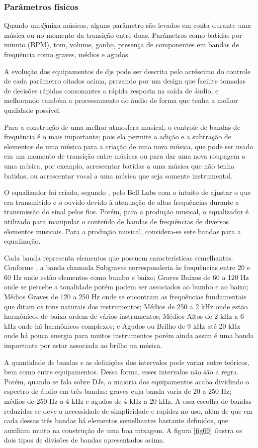 \subsubsection{Parâmetros físicos}
Quando um\textit{dj}mixa músicas, alguns parâmetro são levados em conta durante uma música ou no momento da transição entre duas. Parâmetros como batidas por minuto (BPM), tom, volume, ganho, presença de componentes em bandas de frequência como graves, médios e agudos.
\par
A evolução dos equipamentos de djs pode ser descrita pelo acréscimo do controle de cada parâmetro citados acima, prezando por um design que facilite tomadas de decisões rápidas consonantes a rápida resposta na saída de áudio, e melhorando também o processamento do áudio de forma que tenha a melhor qualidade possível.
\par
Para a construção de uma melhor atmosfera musical, o controle de bandas de frequência é o mais importante; pois ela permite a adição e a subtração de elementos de uma música para a criação de uma nova música, que pode ser usado em um momento de transição entre músicas ou para dar uma nova roupagem a uma música, por exemplo, acrescentar batidas a uma música que não tenha batidas, ou acrescentar vocal a uma música que seja somente instrumental.
\par
O equalizador foi criado, segundo \cite{mixing}, pelo Bell Labs com o intuito de ajustar o que era transmitido e o ouvido devido à atenuação de altas frequências durante a transmissão do sinal pelos fios. Porém, para a produção musical, o equalizador é utilizado para manipular o conteúdo de bandas de frequências de diversos elementos musicais. 
Para a produção musical, considera-se sete bandas para a equalização.
\par 
Cada banda representa elementos que possuem características semelhantes. Conforme \cite{mixing}, a banda chamada Subgraves corresponderia às frequências entre 20 e 60 Hz onde estão elementos como bumbo e baixo; Graves Baixos de 60 a 120 Hz onde se percebe a tonalidade porém podem ser associados ao bumbo e ao baixo; Médios Graves de 120 a 250 Hz onde se encontram as frequências fundamentais que ditam os tons naturais dos instrumentos; Médios de 250 a 2 kHz onde estão harmônicos de baixa ordem de vários instrumentos; Médios Altos de 2 kHz a 6 kHz onde há harmônicos complexos; e Agudos ou Brilho de 9 kHz até 20 kHz onde há pouca energia para muitos instrumentos porém ainda assim é uma banda importante por estar associada ao brilho na música.
\par
A quantidade de bandas e as definições dos intervalos pode variar entre teóricos, bem como entre equipamentos. Dessa forma, esses intervalos não são a regra. Porém, quando se fala sobre DJs, a maioria dos equipamentos acaba dividindo o espectro de áudio em três bandas: graves cuja banda varia de 20 a 250 Hz; médios de 250 Hz a 4 kHz e agudos de 4 kHz a 20 kHz. A essa escolha de bandas reduzidas se deve a necessidade de simplicidade e rapidez no uso, além de que em cada dessas três bandas há elementos semelhantes bastante definidos, que auxiliam muito na construção de uma boa mixagem. A figura \ref{fig09} ilustra os dois tipos de divisões de bandas apresentados acima. 

